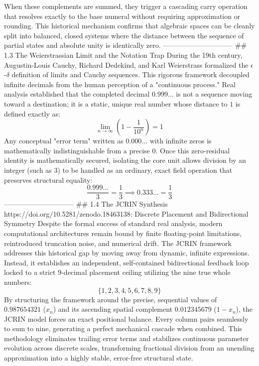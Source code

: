 When these complements are summed, they trigger a cascading carry operation that resolves exactly to the base numeral without requiring approximation or rounding. This historical mechanism confirms that algebraic spaces can be cleanly split into balanced, closed systems where the distance between the sequence of partial states and absolute unity is identically zero.
------------------------------
## 1.3 The Weierstrassian Limit and the Notation Trap
During the 19th century, Augustin-Louis Cauchy, Richard Dedekind, and Karl Weierstrass formalized the $\epsilon$-$\delta$ definition of limits and Cauchy sequences. This rigorous framework decoupled infinite decimals from the human perception of a "continuous process." Real analysis established that the completed decimal $0.999\dots$ is not a sequence moving toward a destination; it is a static, unique real number whose distance to $1$ is defined exactly as:
$$\lim_{n \to \infty} \left(1 - \frac{1}{10^n}\right) = 1$$ 
Any conceptual "error term" written as $0.000\dots$ with infinite zeros is mathematically indistinguishable from a precise $0$. Once this zero-residual identity is mathematically secured, isolating the core unit allows division by an integer (such as 3) to be handled as an ordinary, exact field operation that preserves structural equality:
$$\frac{0.999\dots}{3} = \frac{1}{3} \implies 0.333\dots = \frac{1}{3}$$ 
------------------------------
## 1.4 The JCRIN Synthesis https://doi.org/10.5281/zenodo.18463138: Discrete Placement and Bidirectional Symmetry
Despite the formal success of standard real analysis, modern computational architectures remain bound by finite floating-point limitations, reintroduced truncation noise, and numerical drift.
The JCRIN framework addresses this historical gap by moving away from dynamic, infinite expressions. Instead, it establishes an independent, self-contained bidirectional feedback loop locked to a strict 9-decimal placement ceiling utilizing the nine true whole numbers:
$$\{1, 2, 3, 4, 5, 6, 7, 8, 9\}$$ 
By structuring the framework around the precise, sequential values of $0.987654321$ ($x_n$) and its ascending spatial complement $0.012345679$ ($1 - x_n$), the JCRIN model forces an exact positional balance.
Every column pairs seamlessly to sum to nine, generating a perfect mechanical cascade when combined. This methodology eliminates trailing error terms and stabilizes continuous parameter evolution across discrete scales, transforming fractional division from an unending approximation into a highly stable, error-free structural state.

